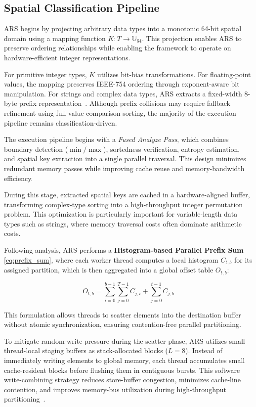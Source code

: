 \subsection{Spatial Classification Pipeline}
ARS begins by projecting arbitrary data types into a monotonic 64-bit spatial domain using a mapping function $K : T \rightarrow \mathbb{U}_{64}$.
This projection enables ARS to preserve ordering relationships while enabling the framework to operate on hardware-efficient integer representations.

For primitive integer types, $K$ utilizes bit-bias transformations.
For floating-point values, the mapping preserves IEEE-754 ordering through exponent-aware bit manipulation.
For strings and complex data types, ARS extracts a fixed-width 8-byte prefix representation~\cite{graefeImplementingSortingDatabase2006}.
Although prefix collisions may require fallback refinement using full-value comparison sorting, the majority of the execution pipeline remains classification-driven.

The execution pipeline begins with a \textit{Fused Analyze Pass}, which combines boundary detection ($\min/\max$), sortedness verification, entropy estimation, and spatial key extraction into a single parallel traversal.
This design minimizes redundant memory passes while improving cache reuse and memory-bandwidth efficiency.

During this stage, extracted spatial keys are cached in a hardware-aligned buffer, transforming complex-type sorting into a high-throughput integer permutation problem.
This optimization is particularly important for variable-length data types such as strings, where memory traversal costs often dominate arithmetic costs.

Following analysis, ARS performs a \textbf{Histogram-based Parallel Prefix Sum} \eqref{eq:prefix_sum}, where each worker thread computes a local histogram $C_{t,b}$ for its assigned partition, which is then aggregated into a global offset table $O_{t,b}$:

\begin{equation} \label{eq:prefix_sum}
O_{t,b} =
\sum_{i=0}^{b-1}
\sum_{j=0}^{T-1}
C_{j,i}
+
\sum_{j=0}^{t-1}
C_{j,b}
\end{equation}

This formulation allows threads to scatter elements into the destination buffer without atomic synchronization, ensuring contention-free parallel partitioning.

To mitigate random-write pressure during the scatter phase, ARS utilizes small thread-local staging buffers as stack-allocated blocks ($L=8$).
Instead of immediately writing elements to global memory, each thread accumulates small cache-resident blocks before flushing them in contiguous bursts.
This software write-combining strategy reduces store-buffer congestion, minimizes cache-line contention, and improves memory-bus utilization during high-throughput partitioning~\cite{nybergAlphasortCachesensitiveParallel1995}.

